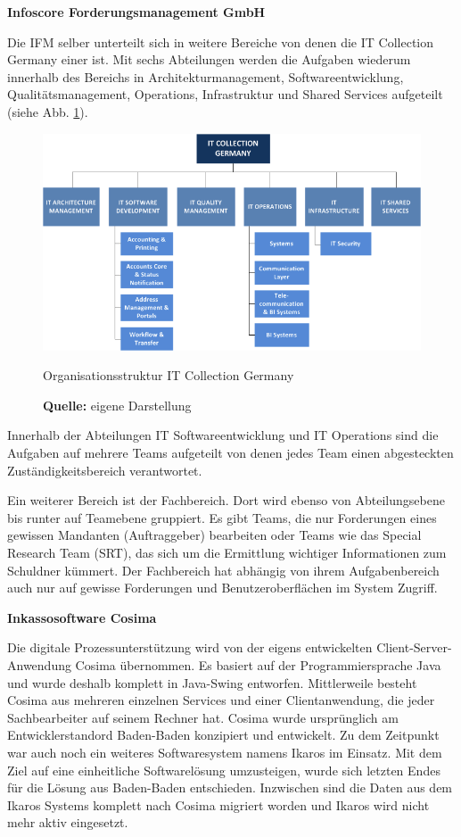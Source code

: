 \textbf{Infoscore Forderungsmanagement GmbH}

Die \gls{IFM} selber unterteilt sich in weitere Bereiche von denen die IT Collection Germany einer ist. Mit sechs Abteilungen werden die Aufgaben wiederum innerhalb des Bereichs in Architekturmanagement, Softwareentwicklung, Qualitätsmanagement, Operations, Infrastruktur und Shared Services aufgeteilt (siehe Abb. \ref{fig:organisationsstruktur}).
\begin{figure}[H]
  \centering
  \includegraphics[scale=0.78]{img/IT_Collection_Germany_Organisation.png}
  \caption{Organisationsstruktur IT Collection Germany}
  \caption*{\textbf{Quelle:} eigene Darstellung}
  \label{fig:organisationsstruktur}
\end{figure}
Innerhalb der Abteilungen IT Softwareentwicklung und IT Operations sind die Aufgaben auf mehrere Teams aufgeteilt von denen jedes Team einen abgesteckten Zuständigkeitsbereich verantwortet.

Ein weiterer Bereich ist der Fachbereich. Dort wird ebenso von Abteilungsebene bis runter auf Teamebene gruppiert. Es gibt Teams, die nur Forderungen eines gewissen Mandanten (Auftraggeber) bearbeiten oder Teams wie das Special Research Team (SRT), das sich um die Ermittlung wichtiger Informationen zum Schuldner kümmert. Der Fachbereich hat abhängig von ihrem Aufgabenbereich auch nur auf gewisse Forderungen und Benutzeroberflächen im System Zugriff.

\textbf{Inkassosoftware Cosima}

Die digitale Prozessunterstützung wird von der eigens entwickelten Client-Server-Anwendung Cosima übernommen. Es basiert auf der Programmiersprache Java und wurde deshalb komplett in Java-Swing entworfen. Mittlerweile besteht Cosima aus mehreren einzelnen Services und einer Clientanwendung, die jeder Sachbearbeiter auf seinem Rechner hat. Cosima wurde ursprünglich am Entwicklerstandord Baden-Baden konzipiert und entwickelt. Zu dem Zeitpunkt war auch noch ein weiteres Softwaresystem namens Ikaros im Einsatz. Mit dem Ziel auf eine einheitliche Softwarelösung umzusteigen, wurde sich letzten Endes für die Lösung aus Baden-Baden entschieden. Inzwischen sind die Daten aus dem Ikaros Systems komplett nach Cosima migriert worden und Ikaros wird nicht mehr aktiv eingesetzt.

